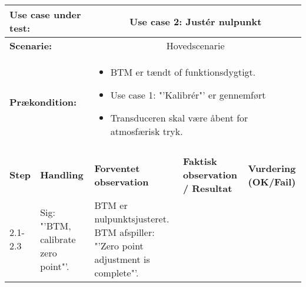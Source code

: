\begin{tabular}{|p{1cm}|p{3cm}|p{4cm}|p{4cm}|p{2cm}|}
\hline
\multicolumn{2}{|p{3cm}|}{\textbf{Use case under test:}} & \multicolumn{3}{c|}{Use case 2: Justér nulpunkt} \\\hline

\multicolumn{2}{|p{3cm}|}{\textbf{Scenarie:}} & \multicolumn{3}{c|}{Hovedscenarie} \\\hline

\multicolumn{2}{|p{3cm}|}{\textbf{Prækondition:}}  & \multicolumn{3}{l|}{\parbox{0.6\textwidth}{
\begin{itemize}[label=$\circ$]
\item BTM er tændt of funktionsdygtigt.
\item Use case 1: "'Kalibrér"' er gennemført
\item Transduceren skal være åbent for atmosfærisk tryk.  
\end{itemize} }}\\\hline

\multicolumn{5}{|c|}{} \\\hline

\textbf{Step} & \textbf{Handling} & \textbf{Forventet observation} & \textbf{Faktisk observation / Resultat} & \textbf{Vurdering (OK/Fail)}\\\hline

2.1-2.3 & Sig: "'BTM, calibrate zero point"'. & BTM er nulpunktsjusteret. BTM afspiller: "'Zero point adjustment is complete"'. &  & \\\hline

\end{tabular}




